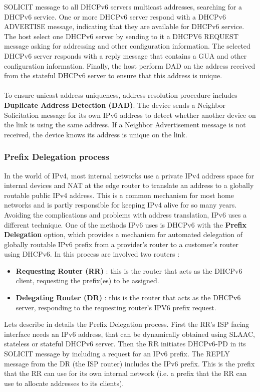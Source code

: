 \documentclass[11pt]{article}
\begin{document}
SOLICIT message to all DHCPv6 servers multicast addresses, searching for a DHCPv6 service. One or more DHCPv6 server respond with a DHCPv6 ADVERTISE message, indicating that they are available for DHCPv6 service. The host select one DHCPv6 server by sending to it a DHCPV6 REQUEST message asking for addressing and other configuration information. The selected DHCPv6 server responds with a reply message that contains a GUA and other configuration information. Finally, the host perform DAD on the address received from the stateful DHCPv6 server to ensure that this address is unique.\\\\ To ensure unicast address uniqueness, address resolution procedure includes \textbf{Duplicate Address Detection (DAD)}. The device sends a Neighbor Solicitation message for its own IPv6 address to detect whether another device on the link is using the same address. If a Neighbor Advertisement message is not received, the device knows its address is unique on the link. 
\subsubsection{Prefix Delegation process}
In the world of IPv4, most internal networks use a private IPv4 address space for internal devices and NAT at the edge router to translate an address to a globally routable public IPv4 address. This is a common mechanism for most home networks and is partly responsible for keeping IPv4 alive for so many years. Avoiding the complications and problems with address translation, IPv6 uses a different technique. One of the methods IPv6 uses is DHCPv6 with the \textbf{Prefix Delegation} option, which provides a mechanism for automated delegation of globally routable IPv6 prefix from a provider's router to a customer's router using DHCPv6. In this process are involved two routers :
\begin{itemize}
\item \textbf{Requesting Router (RR)} : this is the router that acts as the DHCPv6 client, requesting the prefix(es) to be assigned.
\item \textbf{Delegating Router (DR)} : this is the router that acts as the DHCPv6 server, responding to the  requesting router's IPV6 prefix request.
\end{itemize}
Lets describe in details the Prefix Delegation process. First the RR's ISP facing interface needs an IPv6 address, that can be dynamically obtained using SLAAC, stateless or stateful DHCPv6 server. Then the RR initiates DHCPv6-PD in its SOLICIT message by including a request for an IPv6 prefix. The REPLY message from the DR (the ISP router) includes the IPv6 prefix. This is the prefix that the RR can use for its own internal network (i.e. a prefix that the RR can use to allocate addresses to its clients).
\end{document}

